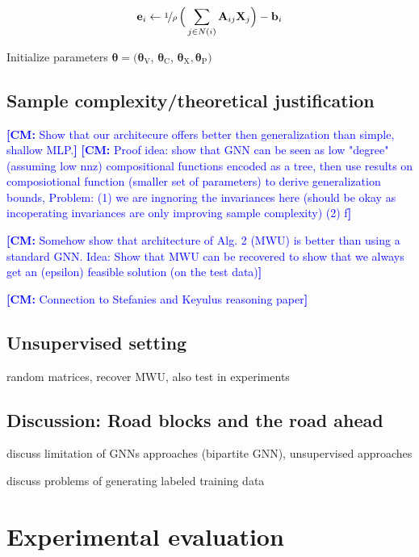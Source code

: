 \documentclass[11pt, DIV=12]{scrartcl}
\theoremstyle{definition}
\renewcommand{\vec}[1]{\mathbf{#1}}
\newcommand{\cm}[1]{{{\textcolor{blue}{\textbf{[CM:} {#1}\textbf{]}}}}}
\begin{document}
\begin{equation}\label{err}
\vec{e}_i \leftarrow \nicefrac{1}{\rho}\,\Big(\sum_{j \in N(i)} \vec{A}_{ij}  \vec{X}_j \Big) - \vec{b}_i   
\end{equation}



Initialize parameters $\boldsymbol{\theta} = (\boldsymbol{\theta}_{\text{V}}$, $\boldsymbol{\theta}_{\text{C}}$, $\boldsymbol{\theta}_{\text{X}}, \boldsymbol{\theta}_{\text{P}})$



\subsection{Sample complexity/theoretical justification}

\cm{Show that our architecure offers better then generalization than simple, shallow MLP.}
\cm{Proof idea: show that GNN can be seen as low "degree" (assuming low nnz) compositional functions encoded as a tree, then use results on composiotional function (smaller set of parameters) to derive generalization bounds, Problem: (1) we are ingnoring the invariances here (should be okay as incoperating invariances are only improving sample complexity) (2) f}


\cm{Somehow show that architecture of Alg. 2 (MWU) is better than using a standard GNN. Idea: Show that MWU can be recovered to show that we always get an (epsilon) feasible solution (on the test data)}

\cm{Connection to Stefanies and Keyulus reasoning paper}

\subsection{Unsupervised setting}

random matrices, recover MWU, also test in experiments


\subsection{Discussion: Road blocks and the road ahead}
						
discuss limitation of GNNs approaches (bipartite GNN), unsupervised approaches

discuss problems of generating labeled training data

\section{Experimental evaluation}
\end{document}
